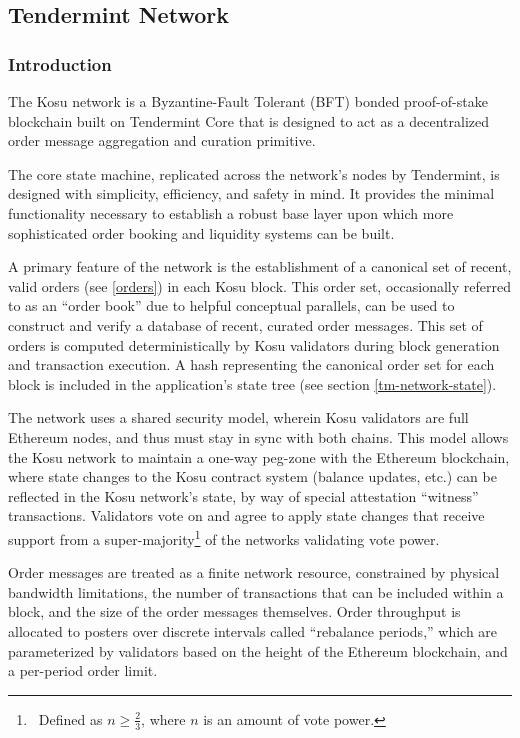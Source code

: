 \documentclass[10pt]{article}
\begin{document}
\subsection{Tendermint Network}\label{tm-network}
\subsubsection{Introduction}\label{tm-network-intro}
The Kosu network is a Byzantine-Fault Tolerant (BFT) bonded proof-of-stake blockchain built on Tendermint Core that is designed to act as a decentralized order message aggregation and curation primitive\cite{bft, tendermint-wp}.
\medskip 

The core state machine, replicated across the network’s nodes by Tendermint, is designed with simplicity, efficiency, and safety in mind. It provides the minimal functionality necessary to establish a robust base layer upon which more sophisticated order booking and liquidity systems can be built.
\medskip

A primary feature of the network is the establishment of a canonical set of recent, valid  orders (see \ref{orders}) in each Kosu block. This order set, occasionally referred to as an ``order book'' due to helpful conceptual parallels, can be used to construct and verify a database of recent, curated order messages. This set of orders is computed deterministically by Kosu validators during block generation and transaction execution. A hash representing the canonical order set for each block is included in the application’s state tree (see section \ref{tm-network-state}).
\medskip

The network uses a shared security model, wherein Kosu validators are full Ethereum nodes, and thus must stay in sync with both chains. This model allows the Kosu network to maintain a one-way peg-zone with the Ethereum blockchain, where state changes to the Kosu contract system (balance updates, etc.) can be reflected in the Kosu network’s state, by way of special attestation ``witness'' transactions. Validators vote on and agree to apply state changes that receive support from a super-majority\footnote{\ Defined as { $ n \geq \frac{2}{3}$}, where {$n$} is an amount of vote power\cite{tendermint-wp}.} of the networks validating vote power.
\medskip

Order messages are treated as a finite network resource, constrained by physical bandwidth limitations, the number of transactions that can be included within a block, and the size of the order messages themselves. Order throughput is allocated to posters over discrete intervals called ``rebalance periods,'' which are parameterized by validators based on the height of the Ethereum blockchain, and a per-period order limit.
\medskip
\end{document}

